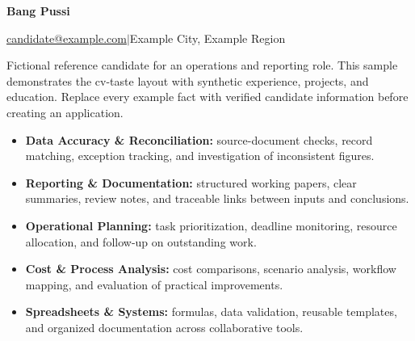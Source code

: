 

\begin{center}
{\Huge\bfseries Bang Pussi}\par\vspace{1.5pt}
\href{mailto:candidate@example.com}{candidate@example.com}\enspace$|$\enspace Example City, Example Region
\end{center}
\vspace{-5.5pt}

\begin{cvbody}
Fictional reference candidate for an operations and reporting role. This sample demonstrates the cv-taste layout with synthetic experience, projects, and education. Replace every example fact with verified candidate information before creating an application.
\end{cvbody}

\begin{cvbody}
\begin{itemize}
\item \textbf{Data Accuracy \& Reconciliation:} source-document checks, record matching, exception tracking, and investigation of inconsistent figures.
\item \textbf{Reporting \& Documentation:} structured working papers, clear summaries, review notes, and traceable links between inputs and conclusions.
\item \textbf{Operational Planning:} task prioritization, deadline monitoring, resource allocation, and follow-up on outstanding work.
\item \textbf{Cost \& Process Analysis:} cost comparisons, scenario analysis, workflow mapping, and evaluation of practical improvements.
\item \textbf{Spreadsheets \& Systems:} formulas, data validation, reusable templates, and organized documentation across collaborative tools.
\end{itemize}
\end{cvbody}

